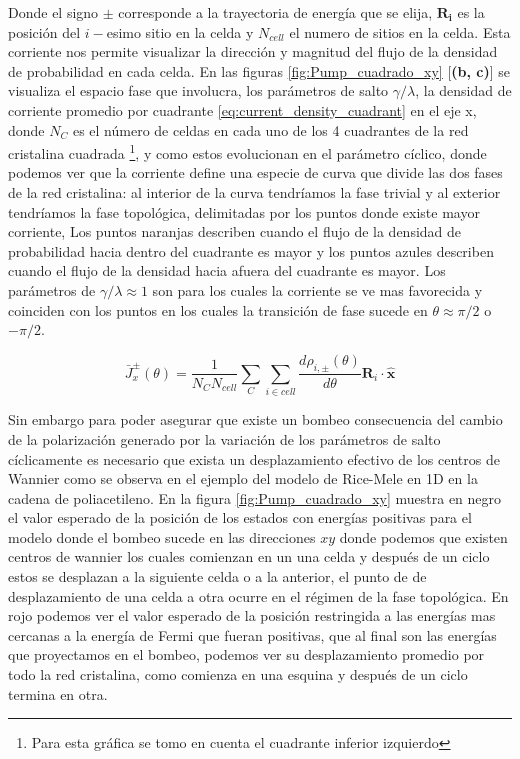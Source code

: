 Donde el signo $\pm$ corresponde a la trayectoria de energía que se elija, $\mathbf{R_i}$ es la posición del $i-$esimo sitio en la celda y $N_{cell}$ el numero de sitios en la celda. Esta corriente nos permite visualizar la dirección y magnitud del flujo de la densidad de probabilidad en cada celda. En las figuras \ref{fig:Pump_cuadrado_xy} [\textbf{(b, c)}] se visualiza el espacio fase que involucra, los parámetros de salto $\gamma/\lambda$, la densidad de corriente promedio por cuadrante \ref{eq:current_density_cuadrant} en el eje x, donde $N_C$ es el número de celdas en cada uno de los 4 cuadrantes de la red cristalina cuadrada \footnote{Para esta gráfica se tomo en cuenta el cuadrante inferior izquierdo}, y como estos evolucionan en el parámetro cíclico,  donde podemos ver que la corriente define una especie de curva que divide las dos fases de la red cristalina: al interior de la curva tendríamos la fase trivial y al exterior tendríamos la fase topológica, delimitadas por los puntos donde existe mayor corriente, Los puntos naranjas describen cuando el flujo de la densidad de probabilidad hacia dentro del cuadrante es mayor y los puntos azules describen cuando el flujo de la densidad hacia afuera del cuadrante es mayor. Los parámetros de $\gamma/\lambda \approx 1$ son para los cuales la corriente se ve mas favorecida y coinciden con los puntos en los cuales la transición de fase sucede en $\theta \approx \pi/2 $ o $-\pi/2$.

\begin{equation}
    \label{eq:current_density_cuadrant}
    \bar{J}^{\pm}_x(\theta) =\frac{1}{N_C N_{cell}} \sum_{C} \sum_{i \in cell} \frac{d \rho_{i,\pm}(\theta)}{d\theta} \mathbf{R}_i \cdot \mathbf{\hat{x}}  
\end{equation}

Sin embargo para poder asegurar que existe un bombeo consecuencia del cambio de la polarización generado por la variación de los parámetros de salto cíclicamente es necesario que exista un desplazamiento efectivo de los centros de Wannier  como se observa en el ejemplo del modelo de Rice-Mele en 1D en la cadena de poliacetileno. En la figura \ref{fig:Pump_cuadrado_xy}  muestra en negro el valor esperado de la posición de los estados con energías positivas para el modelo donde el bombeo sucede en las direcciones $xy$ donde podemos que existen centros de wannier los cuales comienzan en un una celda y después de un ciclo estos se desplazan a la siguiente celda o a la anterior, el punto de de desplazamiento de una celda a otra ocurre en el régimen de la fase topológica. En rojo podemos ver el valor esperado de la posición restringida a las energías mas cercanas a la energía de Fermi que fueran positivas, que al final son las energías que proyectamos en el bombeo, podemos ver su desplazamiento promedio por todo la red cristalina, como comienza en una esquina y después de un ciclo termina en otra.

